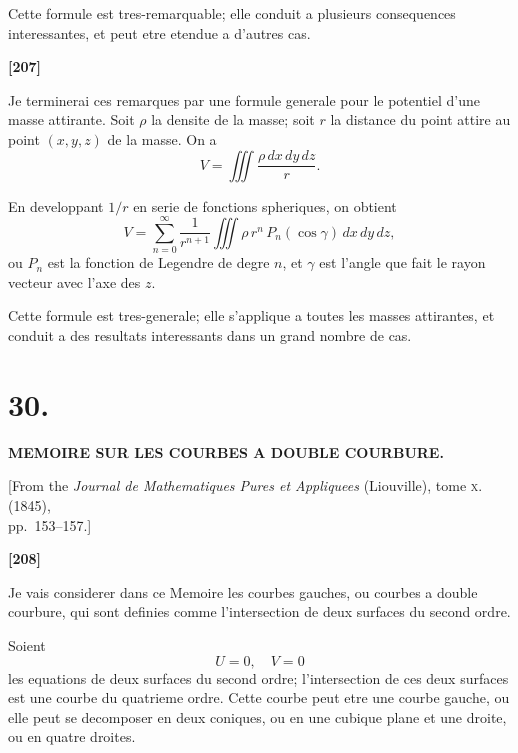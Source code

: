 \documentclass[11pt,a4paper]{article}
\begin{document}
Cette formule est tres-remarquable; elle conduit a plusieurs consequences interessantes,
et peut etre etendue a d'autres cas.

\textbf{[207]}

Je terminerai ces remarques par une formule generale pour le potentiel d'une masse
attirante. Soit $\rho$ la densite de la masse; soit $r$ la distance du point attire au point
$(x, y, z)$ de la masse. On a
\[V = \iiint \frac{\rho\, dx\, dy\, dz}{r}.\]

En developpant $1/r$ en serie de fonctions spheriques, on obtient
\[V = \sum_{n=0}^{\infty} \frac{1}{r^{n+1}} \iiint \rho\, r^n\, P_n(\cos\gamma)\, dx\, dy\, dz,\]
ou $P_n$ est la fonction de Legendre de degre $n$, et $\gamma$ est l'angle que fait le rayon vecteur
avec l'axe des $z$.

Cette formule est tres-generale; elle s'applique a toutes les masses attirantes, et
conduit a des resultats interessants dans un grand nombre de cas.


\newpage
\section*{30.}

\begin{center}
\textbf{MEMOIRE SUR LES COURBES A DOUBLE COURBURE.}
\end{center}

\begin{center}
[From the \textit{Journal de Mathematiques Pures et Appliquees} (Liouville), tome \textsc{x}. (1845),\\
pp.~153--157.]
\end{center}


\textbf{[208]}

Je vais considerer dans ce Memoire les courbes gauches, ou courbes a double
courbure, qui sont definies comme l'intersection de deux surfaces du second ordre.

Soient
\[U = 0,\quad V = 0\]
les equations de deux surfaces du second ordre; l'intersection de ces deux surfaces
est une courbe du quatrieme ordre. Cette courbe peut etre une courbe gauche, ou
elle peut se decomposer en deux coniques, ou en une cubique plane et une droite,
ou en quatre droites.
\end{document}
